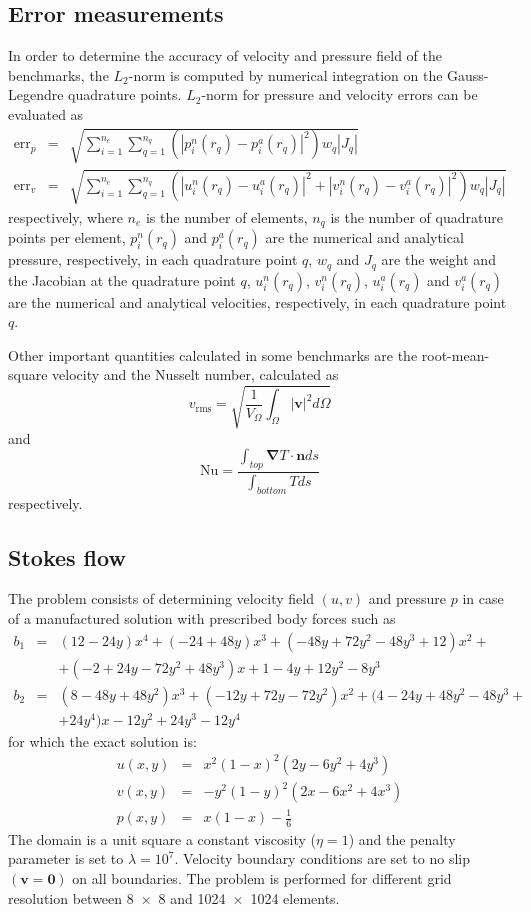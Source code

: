 \documentclass[hidelinks,10pt,a4paper]{article}
\begin{document}
\subsection{Error measurements}\label{sec:error}
In order to determine the accuracy of velocity and pressure field of the benchmarks, the $L_2$-norm is computed by numerical integration on the Gauss-Legendre
quadrature points. $L_2$-norm for pressure and velocity errors can be evaluated as
\begin{eqnarray}
\textrm{err}_p&=&\sqrt{\sum_{i=1}^{n_e}\sum_{q=1}^{n_q}\left(|p^n_i(r_q)-p^a_i(r_q)|^2\right)w_q|J_q|}\nonumber \\
\textrm{err}_v&=&\sqrt{\sum_{i=1}^{n_e}\sum_{q=1}^{n_q}\left(|u^n_i(r_q)-u^a_i(r_q)|^2+|v^n_i(r_q)-v^a_i(r_q)|^2\right)w_q|J_q|}\nonumber
\end{eqnarray}
respectively, where $n_e$ is the number of elements, $n_q$ is the number of quadrature points per element, $p^n_i(r_q)$ and $p^a_i(r_q)$ are the numerical and
analytical pressure, respectively, in each quadrature point $q$, $w_q$  and $J_q$ are the weight and the Jacobian at the quadrature point
$q$, $u^n_i(r_q)$, $v^n_i(r_q)$, $u^a_i(r_q)$ and $v^a_i(r_q)$ are the numerical and analytical velocities, respectively, in each quadrature point $q$.

Other important quantities calculated in some benchmarks are the root-mean-square velocity and the Nusselt number, calculated as
\[v_{\textrm{rms}}=\sqrt{\frac{1}{V_{\Omega}}\int_{\Omega}|\bm{v}|^2 d\Omega}\]
and
\[\textrm{Nu}=\frac{\int_{top}\bm{\nabla} T \cdot \bm{n} ds}{\int_{bottom}T ds}\]
respectively.

\subsection{Stokes flow}\label{sec:stokes}
The problem consists of determining velocity field $(u,v)$ and pressure $p$ in case of a manufactured solution with prescribed body forces such as
\begin{eqnarray}
b_1&=&(12-24y)x^4+(-24+48y)x^3+(-48y+72y^2-48y^3+12)x^2+\nonumber \\
&&+(-2+24y-72y^2+48y^3)x+1-4y+12y^2-8y^3\nonumber \\
b_2&=&(8-48y+48y^2)x^3+(-12y+72y-72y^2)x^2+(4-24y+48y^2-48y^3+\nonumber \\
&&+24y^4)x-12y^2+24y^3-12y^4\nonumber
\end{eqnarray}
for which the exact solution is:
\begin{eqnarray}
u(x,y)&=&x^2(1-x)^2(2y-6y^2+4y^3)\nonumber \\
v(x,y)&=&-y^2(1-y)^2(2x-6x^2+4x^3)\nonumber \\
p(x,y)&=&x(1-x)-\frac{1}{6}\nonumber
\end{eqnarray}
The domain is a unit square a constant viscosity ($\eta=1$) and the penalty parameter is set to $\lambda=10^7$. Velocity boundary conditions are set to no slip
$(\bm{v}=\bm{0})$ on all boundaries. The problem is performed for different grid resolution between \num{8x8} and \num{1024x1024} elements.
\end{document}
